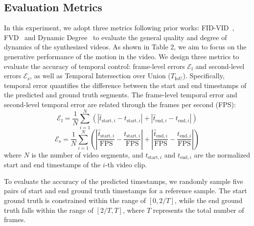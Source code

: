 \subsection{Evaluation Metrics}
In this experiment, we adopt three metrics following prior works: FID-VID~\cite{unterthiner2018towards}, FVD~\cite{balaji2019conditional} and Dynamic Degree~\cite{huang2024vbench} to evaluate the general quality and degree of dynamics of the synthesized videos. 
As shown in Table 2, we aim to focus on the generative performance of the motion in the video.  
We design three metrics to evaluate the accuracy of temporal control: frame-level errors $\mathcal{E}_{\text{f}} $ and second-level errors $\mathcal{E}_{\text{s}} $, as well as Temporal Intersection over Union ($T_{\text{IoU}}$). Specifically, temporal error quantifies the difference between the start and end timestamps of the predicted and ground truth segments. The frame-level temporal error and second-level temporal error are related through the frames per second (FPS):
\begin{equation}
    \mathcal{E}_{\text{f}}   =\frac{1}{N}\sum_{i=1}^{N}\left(\left|\hat{t}_{\mathrm{start},i}-t_{\mathrm{start},i}\right|+\left|\hat{t}_{\mathrm{end},i}-t_{\mathrm{end},i}\right|\right)
\end{equation}
\begin{equation}
    \mathcal{E}_{\text{s}}   = \frac{1}{N} \sum_{i=1}^{N} \left( \left| \frac{\hat{t}_{\mathrm{start},i}}{\mathrm{FPS}} - \frac{t_{\mathrm{start},i}}{\mathrm{FPS}} \right| + \left| \frac{\hat{t}_{\mathrm{end},i}}{\mathrm{FPS}} - \frac{t_{\mathrm{end},i}}{\mathrm{FPS}} \right| \right)
\end{equation}
where \( N \) is the number of video segments, and \( t_{\mathrm{start},i} \) and \( t_{\mathrm{end},i} \) are the normalized start and end timestamps of the \( i \)-th video clip.


To evaluate the accuracy of the predicted timestamps, we randomly sample five pairs of start and end ground truth timestamps for a reference sample. The start ground truth is constrained within the range of $[0, 2/T]$, while the end ground truth falls within the range of $[2/T, T]$, where $T$ represents the total number of frames.

